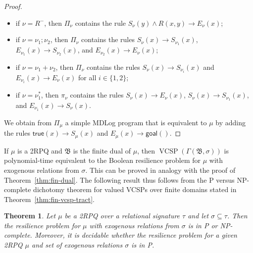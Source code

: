 \documentclass[nonacm]{acmart}
\newcommand{\bB}{{\mathfrak B}}
\DeclareMathOperator{\VCSP}{VCSP}
\newtheorem{theorem}{Theorem}[section]
\begin{document}
\begin{proof}
\begin{itemize}
   \item if $\nu=R^-$, then $\Pi_\nu$ contains the rule $S_\nu(y) \wedge
     R(x,y) \rightarrow E_\nu(x)$;

  \item if $\nu=\nu_1;\nu_2$, then $\Pi_\nu$ contains the rules
    $S_\nu(x) \rightarrow S_{\nu_1}(x)$,
    $E_{\nu_1}(x) \rightarrow S_{\nu_2}(x)$, and $E_{\nu_2}(x) \rightarrow
    E_\nu(x)$;

  \item if $\nu=\nu_1 + \nu_2$, then $\Pi_\nu$ contains the rules
    $S_\nu(x) \rightarrow S_{\nu_i}(x)$ and
    $E_{\nu_i}(x) \rightarrow E_\nu(x)$ for all $i \in \{1,2\}$;

  \item if $\nu=\nu_1^*$, then $\pi_\nu$ contains the rules
    $S_\nu(x) \rightarrow E_\nu(x)$, $S_\nu(x) \rightarrow S_{\nu_1}(x)$,
    and $E_{\nu_1}(x) \rightarrow S_\nu(x)$.
    
  \end{itemize}
  We obtain from $\Pi_\mu$ a simple MDLog program that is equivalent to $\mu$ by adding the rules $\textsf{true}(x) \rightarrow S_\mu(x)$
  and $E_\mu(x) \rightarrow \textsf{goal}()$.
\end{proof}
%


If $\mu$ is
a 2RPQ and $\bB$ is the finite dual of $\mu$, then $\VCSP(\Gamma(\bB,\sigma))$ is polynomial-time equivalent to the Boolean resilience problem for $\mu$ with exogenous relations from $\sigma$. This can be proved in analogy
with the proof of Theorem~\ref{thm:fin-dual}. 
The following result thus follows from the P versus NP-complete dichotomy theorem
for valued VCSPs over finite domains
stated in Theorem~\ref{thm:fin-vcsp-tract}. 
%
\begin{theorem}
\label{thm:rpqbool}
Let $\mu$ be a 2RPQ over a relational signature $\tau$ and let $\sigma \subseteq \tau$. Then the resilience problem for $\mu$ with exogenous relations from $\sigma$ is in P or NP-complete. Moreover, it is decidable whether the resilience problem for a given 2RPQ $\mu$ and set of exogenous relations $\sigma$
is in P.
\end{theorem}
%
\end{document}
